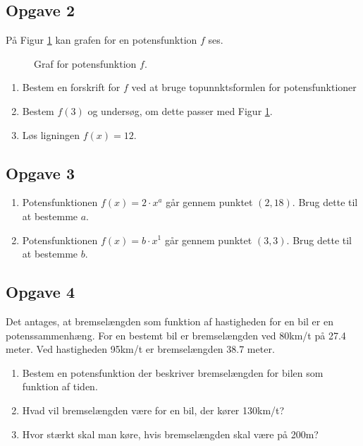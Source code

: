 \subsection*{Opgave 2}
På Figur \ref{fig:potensopg} kan grafen for en potensfunktion $f$ ses. 
\begin{figure}[H]
	\centering
	\caption{Graf for potensfunktion $f$.}
	\label{fig:potensopg}
\end{figure}

\begin{enumerate}[label=\roman*)]
	\item Bestem en forskrift for $f$ ved at bruge topunnktsformlen for potensfunktioner
	\item Bestem $f(3)$ og undersøg, om dette passer med Figur \ref{fig:potensopg}.
	\item Løs ligningen $f(x) = 12$.
\end{enumerate}




\subsection*{Opgave 3}
\begin{enumerate}
	\item Potensfunktionen $f(x) = 2\cdot x^a$ går gennem punktet $(2,18)$. Brug dette til at bestemme $a$.
	\item Potensfunktionen $f(x) = b\cdot x^1$ går gennem punktet $(3,3)$. Brug dette til at bestemme $b$.
\end{enumerate}

\subsection*{Opgave 4}
Det antages, at bremselængden som funktion af hastigheden for en bil er en potenssammenhæng. For en bestemt bil er bremselængden ved 80km/t på 27.4 meter. Ved hastigheden 95km/t er bremselængden 38.7 meter.
\begin{enumerate}[label=\roman*)]
	\item Bestem en potensfunktion der beskriver bremselængden for bilen som funktion af tiden.
	\item Hvad vil bremselængden være for en bil, der kører 130km/t?
	\item Hvor stærkt skal man køre, hvis bremselængden skal være på 200m?
\end{enumerate}